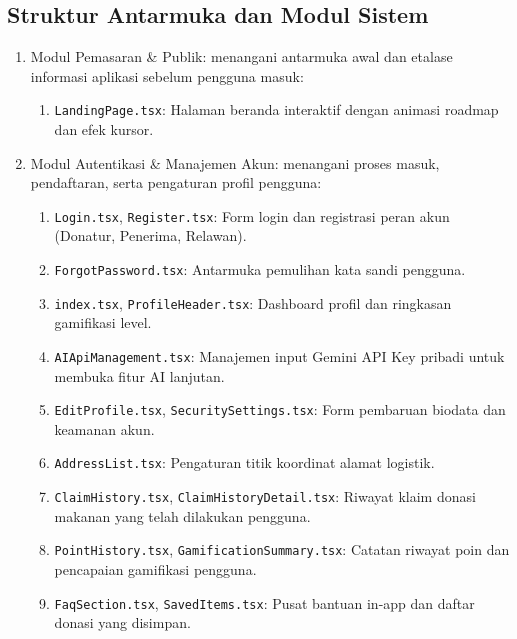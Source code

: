 \subsection{Struktur Antarmuka dan Modul Sistem}
\begin{enumerate}[label=\arabic*.]
    \item Modul Pemasaran \& Publik: menangani antarmuka awal dan etalase informasi aplikasi sebelum pengguna masuk:
    \begin{enumerate}[label=\alph*.]
        \item \texttt{LandingPage.tsx}: Halaman beranda interaktif dengan animasi roadmap dan efek kursor.
    \end{enumerate}
    
    \item Modul Autentikasi \& Manajemen Akun: menangani proses masuk, pendaftaran, serta pengaturan profil pengguna:
    \begin{enumerate}[label=\alph*.]
        \item \texttt{Login.tsx}, \texttt{Register.tsx}: Form login dan registrasi peran akun (Donatur, Penerima, Relawan).
        \item \texttt{ForgotPassword.tsx}: Antarmuka pemulihan kata sandi pengguna.
        \item \texttt{index.tsx}, \texttt{ProfileHeader.tsx}: Dashboard profil dan ringkasan gamifikasi level.
        \item \texttt{AIApiManagement.tsx}: Manajemen input Gemini API Key pribadi untuk membuka fitur AI lanjutan.
        \item \texttt{EditProfile.tsx}, \texttt{SecuritySettings.tsx}: Form pembaruan biodata dan keamanan akun.
        \item \texttt{AddressList.tsx}: Pengaturan titik koordinat alamat logistik.
        \item \texttt{ClaimHistory.tsx}, \texttt{ClaimHistoryDetail.tsx}: Riwayat klaim donasi makanan yang telah dilakukan pengguna.
        \item \texttt{PointHistory.tsx}, \texttt{GamificationSummary.tsx}: Catatan riwayat poin dan pencapaian gamifikasi pengguna.
        \item \texttt{FaqSection.tsx}, \texttt{SavedItems.tsx}: Pusat bantuan in-app dan daftar donasi yang disimpan.
    \end{enumerate}
    

\end{enumerate}
